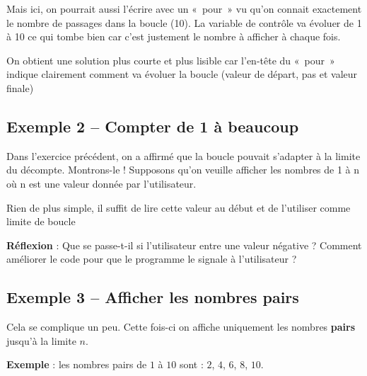 		Mais ici, on pourrait aussi l'écrire avec un «~pour~» vu qu'on
		connait exactement le nombre de passages dans la boucle (10). 
		La variable de contrôle va évoluer de 1 à 10 ce qui tombe bien car
		c'est justement le nombre à afficher à chaque fois.


		On obtient une solution plus courte et plus lisible 
		car l'en-tête du «~pour~» indique clairement
		comment va évoluer la boucle
		(valeur de départ, pas et valeur finale)

	\subsection{Exemple 2 -- Compter de 1 à beaucoup}

		Dans l'exercice précédent, on a
		affirmé que la boucle pouvait s'adapter à la limite du
		décompte. Montrons-le ! Supposons qu'on veuille
		afficher les nombres de 1 à n où n est une valeur donnée par
		l'utilisateur.

		Rien de plus simple, il suffit de lire cette
		valeur au début et de l'utiliser comme limite de boucle


		\textbf{Réflexion} : Que se passe-t-il si l'utilisateur entre une valeur négative ?
		Comment améliorer le code pour que le programme
		le signale à l'utilisateur ?

	\subsection{Exemple 3 -- Afficher les nombres pairs}

		Cela se complique un peu. Cette fois-ci on
		affiche uniquement les nombres \textbf{pairs} jusqu'à la limite $n$.
		
		\textbf{Exemple} : 
		les nombres pairs de $1$ à $10$ sont : $2$, $4$, $6$, $8$, $10$.
		

